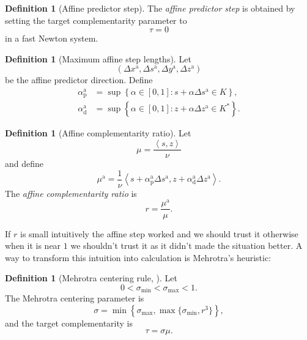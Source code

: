 \documentclass[a4paper,11pt]{book}
\theoremstyle{plain}
\theoremstyle{definition}
\newtheorem{definition}[theorem]{Definition}
\theoremstyle{remark}
\numberwithin{equation}{chapter}
\numberwithin{algorithm}{chapter}
\newcommand{\inner}[2]{\left\langle #1, #2 \right\rangle}
\begin{document}
	\begin{definition}[Affine predictor step]
		The \emph{affine predictor step} is obtained by setting the target
		complementarity parameter to
		\[
		\tau=0
		\]
		in a fast Newton system.
	\end{definition}
	
	\begin{definition}[Maximum affine step lengths]
		Let
		\[
		(\Delta x^{\mathrm a},
		\Delta s^{\mathrm a},
		\Delta y^{\mathrm a},
		\Delta z^{\mathrm a})
		\]
		be the affine predictor direction. Define
		\begin{align}
			\alpha_{\mathrm p}^{\mathrm a}
			&=
			\sup
			\left\{
			\alpha\in[0,1]:
			s+\alpha\Delta s^{\mathrm a}\in K
			\right\},\\
			\alpha_{\mathrm d}^{\mathrm a}
			&=
			\sup
			\left\{
			\alpha\in[0,1]:
			z+\alpha\Delta z^{\mathrm a}\in K^*
			\right\}.
		\end{align}
	\end{definition}
	
	\begin{definition}[Affine complementarity ratio]
		Let
		\[
		\mu=\frac{\inner{s}{z}}{\nu}
		\]
		and define
		\[
		\mu^{\mathrm a}
		=
		\frac1\nu
		\inner{
			s+\alpha_{\mathrm p}^{\mathrm a}\Delta s^{\mathrm a}
		}{
			z+\alpha_{\mathrm d}^{\mathrm a}\Delta z^{\mathrm a}
		}.
		\]
		The \emph{affine complementarity ratio} is
		\begin{equation}
			r=\frac{\mu^{\mathrm a}}{\mu}.
		\end{equation}
	\end{definition}
	
	If $r$ is small intuitively the affine step worked and we should trust it otherwise when it is near $1$ we shouldn't trust it  as it didn't made the situation better. A way to transform this intuition into calculation is Mehrotra's heuristic:
	
	\begin{definition}[Mehrotra centering rule, \cite{Mehrotra1992}]
		Let
		\[
		0<\sigma_{\min}<\sigma_{\max}<1.
		\]
		The Mehrotra centering parameter is
		\begin{equation}
			\sigma
			=
			\min
			\left\{
			\sigma_{\max},
			\max\{\sigma_{\min},r^3\}
			\right\},
		\end{equation}
		and the target complementarity is
		\[
		\tau=\sigma\mu.
		\]
	\end{definition}
	
\end{document}
